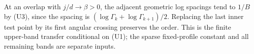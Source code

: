 At an overlap with $j/d\to\beta>0$, the adjacent geometric log spacings tend to $1/B$ by (U3), since the spacing is $(\log\Gamma_k+\log\Gamma_{k+1})/2$. Replacing the last inner test point by its first angular crossing preserves the order. This is the finite upper-band transfer conditional on (U1); the sparse fixed-profile constant and all remaining bands are separate inputs.
